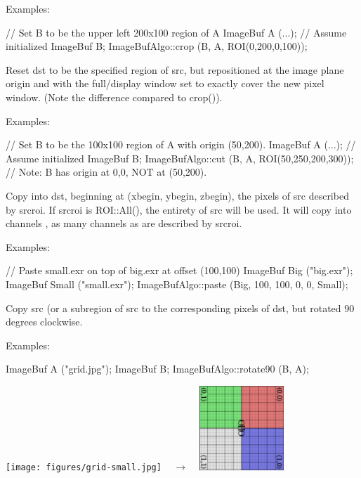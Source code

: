 \smallskip
\noindent Examples:
\begin{code}
    // Set B to be the upper left 200x100 region of A
    ImageBuf A (...);  // Assume initialized
    ImageBuf B;
    ImageBufAlgo::crop (B, A, ROI(0,200,0,100));
\end{code}
\apiend


 
Reset {\cf dst} to be the specified region of {\cf src}, but repositioned at
the image plane origin and with the full/display window set to exactly cover
the new pixel window.  (Note the difference compared to {\cf crop()}).

\smallskip
\noindent Examples:
\begin{code}
    // Set B to be the 100x100 region of A with origin (50,200).
    ImageBuf A (...);  // Assume initialized
    ImageBuf B;
    ImageBufAlgo::cut (B, A, ROI(50,250,200,300));
    // Note: B has origin at 0,0, NOT at (50,200).
\end{code}
\apiend


 
Copy into {\cf dst}, beginning at {\cf (xbegin, ybegin, zbegin)}, the pixels of
{\cf src} described by {\cf srcroi}.  If {\cf srcroi} is {\cf ROI::All()},
the entirety of src will be used.  It will copy into channels 
{\cf [chbegin...]}, as many channels as are described by {\cf srcroi}.

\smallskip
\noindent Examples:
\begin{code}
    // Paste small.exr on top of big.exr at offset (100,100)
    ImageBuf Big ("big.exr");
    ImageBuf Small ("small.exr");
    ImageBufAlgo::paste (Big, 100, 100, 0, 0, Small);
\end{code}
\apiend


 
Copy {\cf src} (or a subregion of {\cf src} to the corresponding pixels
of {\cf dst}, but rotated 90 degrees clockwise.

\smallskip
\noindent Examples:
\begin{code}
    ImageBuf A ("grid.jpg");
    ImageBuf B;
    ImageBufAlgo::rotate90 (B, A);
\end{code}
\spc \texttt{[image: figures/grid-small.jpg]}
~ {\Huge $\rightarrow$} ~
\includegraphics[width=1.25in]{figures/rotate90.jpg} \\
\apiend


